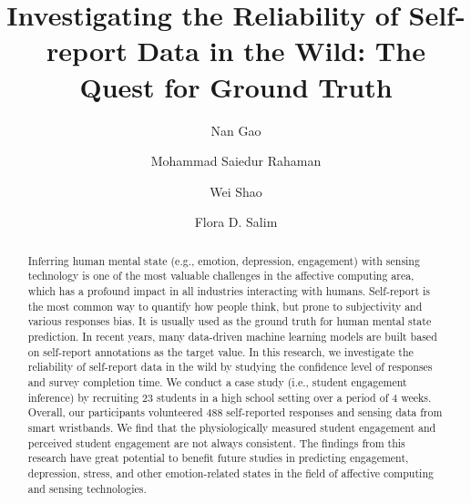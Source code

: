 \documentclass[sigconf]{acmart}
\begin{document}
\title{Investigating the Reliability of Self-report Data in the Wild: The Quest for Ground Truth}

\author{Nan Gao}

\author{Mohammad Saiedur Rahaman}

\author{Wei Shao}


\author{Flora D. Salim}

\renewcommand{\shortauthors}{Gao et al.}

\begin{abstract}
  Inferring human mental state (e.g., emotion, depression, engagement) with sensing technology is one of the most valuable challenges in the affective computing area, which has a profound impact in all industries interacting with humans. Self-report is the most common way to quantify how people think, but prone to subjectivity and various responses bias. It is usually used as the ground truth for human mental state prediction. In recent years, many data-driven machine learning models are built based on self-report annotations as the target value. In this research, we investigate the reliability of self-report data in the wild by studying the confidence level of responses and survey completion time. We conduct a case study (i.e., student engagement inference) by recruiting 23 students in a high school setting over a period of 4 weeks. Overall, our participants volunteered 488 self-reported responses and sensing data from smart wristbands. We find that the physiologically measured student engagement and perceived student engagement are not always consistent. The findings from this research have great potential to benefit future studies in predicting engagement, depression, stress, and other emotion-related states in the field of affective computing and sensing technologies.
\end{abstract}
\end{document}
